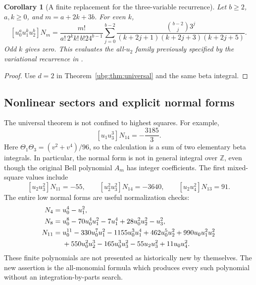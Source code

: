 \documentclass[11pt,letterpaper]{article}
\numberwithin{equation}{section}
\newtheorem{corollary}[theorem]{Corollary}
\theoremstyle{definition}\newtheorem{definition}[theorem]{Definition}
\theoremstyle{remark}\newtheorem{remark}[theorem]{Remark}
\begin{document}
\begin{corollary}[A finite replacement for the three-variable recurrence]
\label{ubg:cor:u2}
Let $b\ge2$, $a,k\ge0$, and $m=a+2k+3b$. For even $k$,
\begin{equation}\label{ubg:eq:u2}
 [u_0^a u_1^k u_2^b]N_m
 =\frac{m!}{a!\,2^kk!\,b!24^{b-1}}
 \sum_{j=0}^{b-2}
 \frac{\binom{b-2}j3^j}
 {(k+2j+1)(k+2j+3)(k+2j+5)}.
\end{equation}
Odd $k$ gives zero. This evaluates the all-$u_2$ family previously
specified by the variational recurrence in \cite[Section 4]{HTG}.
\end{corollary}
\begin{proof}
Use $d=2$ in Theorem~\ref{ubg:thm:universal} and the same beta integral.
\end{proof}

\subsection{Nonlinear sectors and explicit normal forms}
The universal theorem is not confined to highest squares. For example,
\begin{equation}\label{ubg:eq:cubic}
 \boxed{[u_1u_3^3]N_{14}=-\frac{3185}{3}.}
\end{equation}
Here $\Theta_1\Theta_3=(v^2+v^4)/96$, so the calculation is a sum of
two elementary beta integrals. In particular, the normal form is not
in general integral over $\mathbb Z$, even though the original Bell
polynomial $A_m$ has integer coefficients.
The first mixed-square values include
\begin{equation}\label{ubg:eq:small-mixed}
 [u_2u_3^2]N_{11}=-55,\qquad
 [u_2^2u_3^2]N_{14}=-3640,\qquad
 [u_2u_4^2]N_{13}=91.
\end{equation}
The entire low normal forms are useful normalization checks:
\begin{align}
 N_4={}&u_0^4-u_1^2,\label{ubg:eq:N4}\\
 N_8={}&u_0^8-70u_0^4u_1^2-7u_1^4
                         +28u_0^2u_2^2-u_3^2,\label{ubg:eq:N8}\\
 N_{11}={}&u_0^{11}-330u_0^7u_1^2-1155u_0^3u_1^4
             +462u_0^5u_2^2+990u_0u_1^2u_2^2\notag\\
 &+550u_0^2u_2^3-165u_0^3u_3^2-55u_2u_3^2+11u_0u_4^2.
 \label{ubg:eq:N11}
\end{align}
These finite polynomials are not presented as historically new by
themselves. The new assertion is the all-monomial formula which
produces every such polynomial without an integration-by-parts search.
\end{document}
